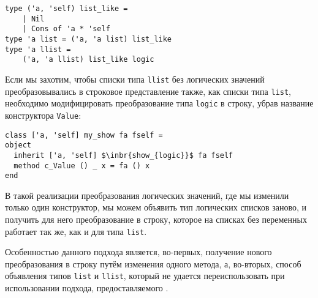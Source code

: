 \begin{lstlisting}
type ('a, 'self) list_like = 
    | Nil 
    | Cons of 'a * 'self
type 'a list = ('a, 'a list) list_like
type 'a llist = 
    ('a, 'a llist) list_like logic
\end{lstlisting}
%

Если мы захотим, чтобы списки типа \lstinline{llist} без логических значений преобразовывались в строковое представление также, как списки типа \lstinline{list}, необходимо модифицировать преобразование типа \lstinline{logic} в строку, убрав название конструктора \lstinline{Value}:

\begin{lstlisting}
class ['a, 'self] my_show fa fself = 
object
  inherit ['a, 'self] $\inbr{show_{logic}}$ fa fself
  method c_Value () _ x = fa () x
end
\end{lstlisting}
В такой реализации преобразования логических значений, где мы изменили только один конструктор, мы можем объявить тип логических списков заново, и получить для него преобразование в строку, которое на списках без переменных работает так же, как и для типа \lstinline{list}.

Особенностью данного подхода является, во-первых, получение нового преобразования в строку путём изменения одного метода, а, во-вторых, способ объявления типов \lstinline{list} и \lstinline{llist}, который не удается переиспользовать при использовании подхода, предоставляемого \visitors{}.

%

%
%
%

